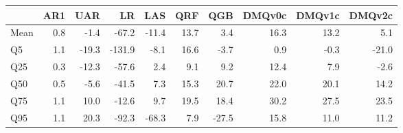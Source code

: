 \begin{tabular}{lrrrrrrrrr}
\toprule
 & AR1 & UAR & LR & LAS & QRF & QGB & DMQv0c & DMQv1c & DMQv2c \\
\midrule
Mean & 0.8 & -1.4 & -67.2 & -11.4 & 13.7 & 3.4 & 16.3 & 13.2 & 5.1 \\
Q5 & 1.1 & -19.3 & -131.9 & -8.1 & 16.6 & -3.7 & 0.9 & -0.3 & -21.0 \\
Q25 & 0.3 & -12.3 & -57.6 & 2.4 & 9.1 & 9.2 & 12.4 & 7.9 & -2.6 \\
Q50 & 0.5 & -5.6 & -41.5 & 7.3 & 15.3 & 20.7 & 22.0 & 20.1 & 14.2 \\
Q75 & 1.1 & 10.0 & -12.6 & 9.7 & 19.5 & 18.4 & 30.2 & 27.5 & 23.5 \\
Q95 & 1.1 & 20.3 & -92.3 & -68.3 & 7.9 & -27.5 & 15.8 & 11.0 & 11.2 \\
\bottomrule
\end{tabular}
